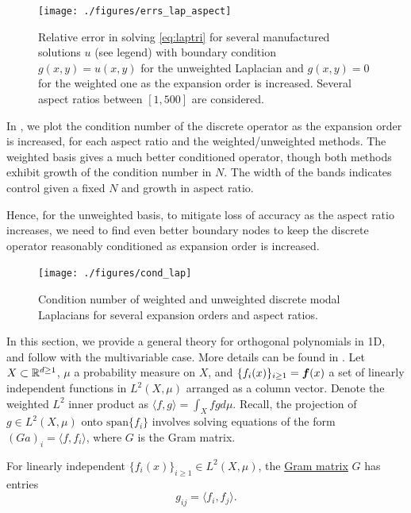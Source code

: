 \begin{figure}[H]
	\centering
	\texttt{[image: ./figures/errs\_lap\_aspect]}
	\caption{Relative error in solving \eqref{eq:laptri} for several manufactured solutions $u$ (see legend) with boundary condition $g(x,y) = u(x,y)$ for the unweighted Laplacian and $g(x,y)=0$ for the weighted one as the expansion order is increased. Several aspect ratios between $[1,500]$ are considered.}\label{fig:errslapaspect}
\end{figure}
In , we plot the condition number of the discrete operator as the expansion order is increased, for each aspect ratio and the weighted/unweighted methods. The weighted basis gives a much better conditioned operator, though both methods exhibit growth of the condition number in $N$. The width of the bands indicates control given a fixed $N$ and growth in aspect ratio.

Hence, for the unweighted basis, to mitigate loss of accuracy as the aspect ratio increases, we need to find even better boundary nodes to keep the discrete operator reasonably conditioned as expansion order is increased. 


\begin{figure}[H]
	\centering
	\texttt{[image: ./figures/cond\_lap]}
	\caption{Condition number of weighted and unweighted discrete modal Laplacians for several expansion orders and aspect ratios.}\label{fig:lapcond}
\end{figure}

\newpage
{}

In this section, we provide a general theory for orthogonal polynomials in 1D, and follow with the multivariable case. More details can be found in \cite{dunkl_xu}. Let $X \subset \mathbb{R}^{d\geq 1}$, $\mu$ a probability measure on $X$, and $\{f_i(x)\}_{i\geq 1}=\boldsymbol{f}(x)$ a set of linearly independent functions in $L^2(X,\mu)$ arranged as a column vector. Denote the weighted $L^2$ inner product as $\langle f, g \rangle = \int_{X} fg d\mu$. Recall, the projection of $g \in L^2(X,\mu)$ onto $\text{span}\{f_i\}$ involves solving equations of the form $(Ga)_i = \langle f,f_i\rangle$, where $G$ is the Gram matrix.

\begin{definition}\normalfont
For linearly independent $\{f_i(x)\}_{i\geq 1} \in L^2(X,\mu)$, the \underline{Gram matrix} $G$ has entries
	$$g_{ij} = \langle f_i,f_j\rangle.$$
\end{definition}

